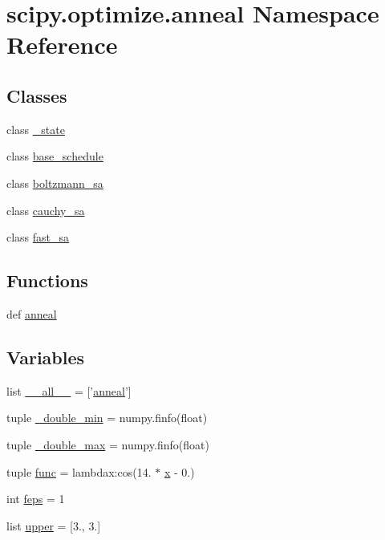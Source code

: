 \hypertarget{namespacescipy_1_1optimize_1_1anneal}{}\section{scipy.\+optimize.\+anneal Namespace Reference}
\label{namespacescipy_1_1optimize_1_1anneal}
\subsection*{Classes}
\begin{DoxyCompactItemize}
\item 
class \hyperlink{classscipy_1_1optimize_1_1anneal_1_1__state}{\+\_\+state}
\item 
class \hyperlink{classscipy_1_1optimize_1_1anneal_1_1base__schedule}{base\+\_\+schedule}
\item 
class \hyperlink{classscipy_1_1optimize_1_1anneal_1_1boltzmann__sa}{boltzmann\+\_\+sa}
\item 
class \hyperlink{classscipy_1_1optimize_1_1anneal_1_1cauchy__sa}{cauchy\+\_\+sa}
\item 
class \hyperlink{classscipy_1_1optimize_1_1anneal_1_1fast__sa}{fast\+\_\+sa}
\end{DoxyCompactItemize}
\subsection*{Functions}
\begin{DoxyCompactItemize}
\item 
def \hyperlink{namespacescipy_1_1optimize_1_1anneal_a6e856bcbe0ef0a2074e01b790f5dd815}{anneal}
\end{DoxyCompactItemize}
\subsection*{Variables}
\begin{DoxyCompactItemize}
\item 
list \hyperlink{namespacescipy_1_1optimize_1_1anneal_a7b74d0f5e2ba2cd3719916a14ee26ab2}{\+\_\+\+\_\+all\+\_\+\+\_\+} = \mbox{[}'\hyperlink{namespacescipy_1_1optimize_1_1anneal_a6e856bcbe0ef0a2074e01b790f5dd815}{anneal}'\mbox{]}
\item 
tuple \hyperlink{namespacescipy_1_1optimize_1_1anneal_af5e528ec388b7b92412aadde93e8c4b8}{\+\_\+double\+\_\+min} = numpy.\+finfo(float)
\item 
tuple \hyperlink{namespacescipy_1_1optimize_1_1anneal_acbff336abdcf5645b0c7aaef918776d4}{\+\_\+double\+\_\+max} = numpy.\+finfo(float)
\item 
tuple \hyperlink{namespacescipy_1_1optimize_1_1anneal_a3661d82424de8745ae3e1fa2124c7d86}{func} = lambdax\+:cos(14. $\ast$ \hyperlink{vecnorm1_8cc_ac73eed9e41ec09d58f112f06c2d6cb63}{x} -\/ 0.)
\item 
int \hyperlink{namespacescipy_1_1optimize_1_1anneal_a2afdf374faad6006f3d7b99f788be82b}{feps} = 1
\item 
list \hyperlink{namespacescipy_1_1optimize_1_1anneal_a043335cd5334b15f26ffea18942a2149}{upper} = \mbox{[}3., 3.\mbox{]}
\end{DoxyCompactItemize}


